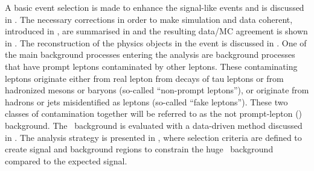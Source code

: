  A basic event selection is made to enhance the signal-like events and is discussed in . The necessary  corrections in order to make simulation and data coherent, introduced in , are summarised in  and the resulting data/MC agreement is shown in . The reconstruction of the physics objects in the event is discussed in . One of the main background processes entering the analysis are background processes that have prompt leptons contaminated by other leptons. These contaminating leptons originate either from real lepton from decays of tau leptons or from hadronized mesons or baryons
 (so-called ``non-prompt leptons''), or originate from hadrons or jets misidentified as leptons (so-called ``fake leptons'').  These two classes  of contamination together will be referred to as the not prompt-lepton (\NPL) background. The \NPL\ background  is
 evaluated with a data-driven method discussed in . The analysis strategy is presented in , where selection criteria are defined to create signal and background regions to constrain the huge \SM\ background compared to the expected signal. %


